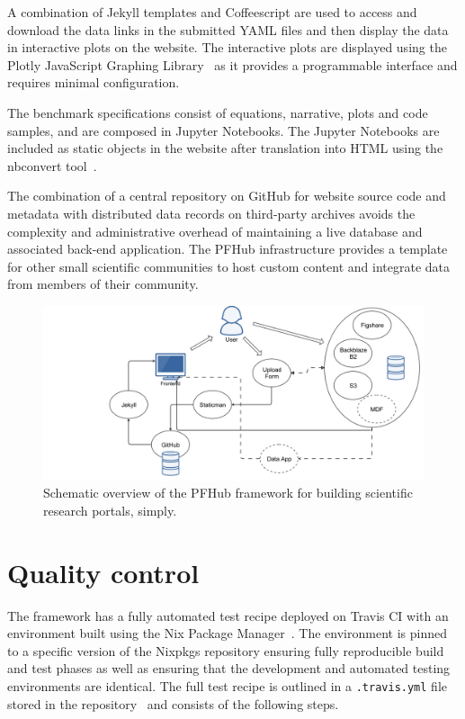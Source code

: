 \documentclass{jors}
\begin{document}
A combination of Jekyll templates and Coffeescript are used to access
and download the data links in the submitted YAML files and then
display the data in interactive plots on the website. The interactive
plots are displayed using the Plotly JavaScript Graphing
Library~\cite{plotly} as it provides a programmable interface and
requires minimal configuration.

The benchmark specifications consist of equations, narrative, plots
and code samples, and are composed in Jupyter Notebooks. The Jupyter
Notebooks are included as static objects in the website after
translation into HTML using the nbconvert tool~\cite{jupyter}.

The combination of a central repository on GitHub for website source
code and metadata with distributed data records on third-party
archives avoids the complexity and administrative overhead of
maintaining a live database and associated back-end application. The
PFHub infrastructure provides a template for other small scientific
communities to host custom content and integrate data from members of
their community.

\begin{figure}
  \includegraphics[width=\textwidth]{pfhub_website.png}
  \caption{Schematic overview of the PFHub framework for building
    scientific research portals, simply.}
  \centering
  \label{fig:pfhub_website}
\end{figure}

\section*{Quality control}

The framework has a fully automated test recipe deployed on Travis CI
with an environment built using the Nix Package
Manager~\cite{nix}. The environment is pinned to a specific version of
the Nixpkgs repository ensuring fully reproducible build and test
phases as well as ensuring that the development and automated testing
environments are identical. The full test recipe is outlined in a
\texttt{.travis.yml} file stored in the repository~\cite{travisyml}
and consists of the following steps.
\end{document}
